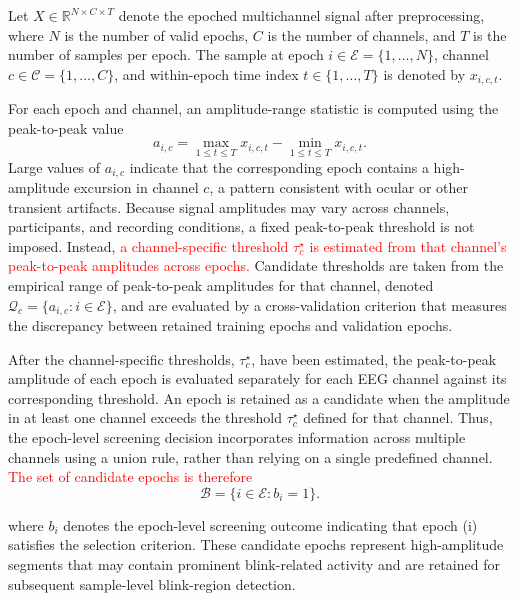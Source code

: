 \documentclass[journal,twoside,web]{ieeecolor}
\newcommand{\rev}[1]{\textcolor{red}{#1}}
\begin{document}
Let \(X \in \mathbb{R}^{N \times C \times T}\) denote the epoched multichannel
signal after preprocessing, where \(N\) is the number of valid epochs, \(C\) is
the number of channels, and \(T\) is the number of samples per epoch. The sample
at epoch \(i \in \mathcal{E}=\{1,\ldots,N\}\), channel
\(c \in \mathcal{C}=\{1,\ldots,C\}\), and within-epoch time index
\(t \in \{1,\ldots,T\}\) is denoted by \(x_{i,c,t}\).

For each epoch and channel, an amplitude-range statistic is computed using the  peak-to-peak value
\begin{equation}
a_{i,c}
= \max_{1 \leq t \leq T} x_{i,c,t}
- \min_{1 \leq t \leq T} x_{i,c,t}.
\end{equation}
Large values of \(a_{i,c}\) indicate that the corresponding epoch contains a high-amplitude excursion in channel \(c\), a pattern consistent with ocular or other transient artifacts.
Because signal amplitudes may vary across channels, participants, and recording conditions, a fixed peak-to-peak threshold is not imposed.
%
Instead, \rev{a channel-specific threshold \(\tau_c^\star\) is estimated from that channel's peak-to-peak amplitudes across epochs.}
Candidate thresholds are taken from the empirical range of peak-to-peak amplitudes for that channel, denoted
\(\mathcal{Q}_c=\{a_{i,c}: i \in \mathcal{E}\}\), and are evaluated by a
cross-validation criterion that measures the discrepancy between retained training epochs and validation epochs.

%
%
%



After the channel-specific thresholds, \(\tau_c^\star\), have been estimated, the peak-to-peak amplitude of each epoch is evaluated separately for each EEG channel against its corresponding threshold.
An epoch is retained as a candidate when the amplitude in at least one channel exceeds the threshold \(\tau_c^\star\) defined for that channel. Thus, the epoch-level screening decision incorporates information across multiple channels using a union rule, rather than relying on a single predefined channel. %
\rev{The set of candidate epochs is therefore}
\begin{equation}
\mathcal{B}=\{i \in \mathcal{E}: b_i=1\}.
\end{equation}


where  \(b_i\) denotes the epoch-level screening outcome indicating that epoch (i) satisfies the selection criterion. These candidate epochs represent high-amplitude segments that may contain prominent blink-related activity and are retained for subsequent sample-level blink-region detection.
\end{document}
